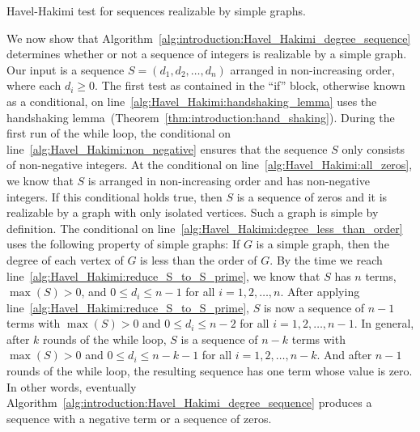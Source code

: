 \begin{algorithm}[!htpb]
\dontprintsemicolon  %
\BlankLine
{}
\caption{Havel-Hakimi test for sequences realizable by simple graphs.}
\label{alg:introduction:Havel_Hakimi_degree_sequence}
\end{algorithm}

We now show that
Algorithm~\ref{alg:introduction:Havel_Hakimi_degree_sequence}
determines whether or not a sequence of integers is realizable by a
simple graph. Our input is a sequence $S = (d_1, d_2, \dots, d_n)$
arranged in non-increasing order, where each $d_i \geq 0$. The first
test as contained in the ``if'' block, otherwise known as a
conditional, on line~\ref{alg:Havel_Hakimi:handshaking_lemma} uses the
handshaking
lemma~(Theorem~\ref{thm:introduction:hand_shaking}). During the first
run of the while loop, the conditional on
line~\ref{alg:Havel_Hakimi:non_negative} ensures that the sequence $S$
only consists of non-negative integers. At the conditional on
line~\ref{alg:Havel_Hakimi:all_zeros}, we know that $S$ is arranged in
non-increasing order and has non-negative integers. If this
conditional holds true, then $S$ is a sequence of zeros and it is
realizable by a graph with only isolated vertices. Such a graph is
simple by definition. The conditional on
line~\ref{alg:Havel_Hakimi:degree_less_than_order} uses the following
property of simple graphs: If $G$ is a simple graph, then the degree
of each vertex of $G$ is less than the order of $G$. By the time we
reach line~\ref{alg:Havel_Hakimi:reduce_S_to_S_prime}, we know that
$S$ has $n$ terms, $\max(S) > 0$, and $0 \leq d_i \leq n - 1$ for all
$i = 1, 2, \dots, n$. After applying
line~\ref{alg:Havel_Hakimi:reduce_S_to_S_prime}, $S$ is now a sequence
of $n - 1$ terms with $\max(S) > 0$ and $0 \leq d_i \leq n - 2$ for all
$i = 1, 2, \dots, n-1$. In general, after $k$ rounds of the while
loop, $S$ is a sequence of $n - k$ terms with $\max(S) > 0$ and
$0 \leq d_i \leq n - k - 1$ for all $i = 1, 2, \dots, n-k$. And after
$n - 1$ rounds of the while loop, the resulting sequence has one term
whose value is zero. In other words, eventually
Algorithm~\ref{alg:introduction:Havel_Hakimi_degree_sequence} produces
a sequence with a negative term or a sequence of zeros.


